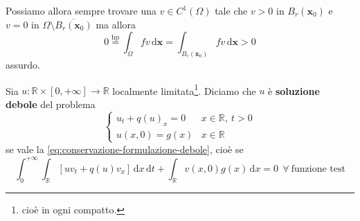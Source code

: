 \documentclass[10pt,a4paper,twoside,openright]{book}
\newcommand{\x}{\mathbf{x}}
\newcommand{\de}{\,\mathrm d}
\newcommand{\dx}{\de x}
\newcommand{\dt}{\de t}
\newcommand{\dxx}{\de \x}
\begin{document}
\begin{dimostrazione}
\begin{figure}[H]
\end{figure}
\FloatBarrier

Possiamo allora sempre trovare una $v\in C^{1}(\Omega)$ tale che $v>0$ in $B_{r}(\x_{0})$ e $v=0$ in $\Omega \setminus \overline{B_{r}(\x_{0})}$ ma allora
\begin{equation*}
	0 \overset{\text{hp}}{=} \int _{\Omega } fv\dxx=\int _{B_{r}(\x_{0})} fv\dxx >0
\end{equation*}
assurdo.
\end{dimostrazione}
\begin{definition}
	 Sia $u:\mathbb{R} \times [ 0,+\infty ]\rightarrow \mathbb{R}$ localmente limitata\footnote{cioè in ogni compatto.}. Diciamo che $u$ è \textbf{soluzione debole} del problema
	\begin{equation*}
		\begin{cases}
			u_{t} +q(u)_{x} =0 & x\in \mathbb{R} ,\ t >0 \\
			u(x,0) =g(x)      & x\in \mathbb{R}         
		\end{cases}
	\end{equation*}
	se vale la \eqref{eq:conservazione-formulazione-debole}, cioè se
	\begin{equation*}
		\int ^{+\infty }_{0}\int _{\mathbb{R}}[ uv_{t} +q(u) v_{x}] \dx\dt+\int _{\mathbb{R}} v(x,0) g(x) \dx=0\ \ \forall \ \text{funzione test}
	\end{equation*}
\end{definition}
\end{document}
